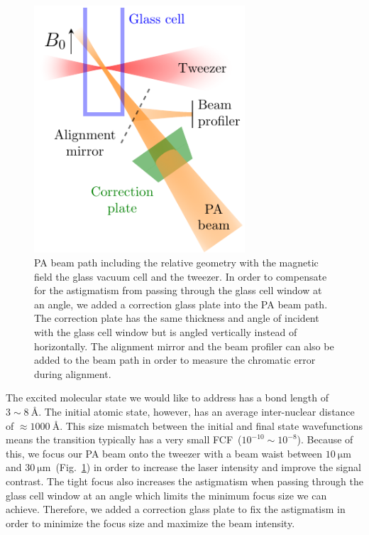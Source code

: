 \begin{figure}
  \centering
  \includegraphics[width=0.7\textwidth]{figures/pa_beampath.pdf}
  \caption[PA beam path]{
    PA beam path including the relative geometry with the magnetic field
    the glass vacuum cell and the tweezer.
    In order to compensate for the astigmatism from passing through the glass cell window
    at an angle, we added a correction glass plate into the PA beam path.
    The correction plate has the same thickness and angle of incident with the glass cell window
    but is angled vertically instead of horizontally.
    The alignment mirror and the beam profiler can also be added to the beam path
    in order to measure the chromatic error during alignment.
    \label{fig:pa:beampath}}
\end{figure}

The excited molecular state we would like to address has a bond length of $3\sim8~\text{\AA}$.
The initial atomic state, however, has an average inter-nuclear distance of
$\approx\!1000~\text{\AA}$.
This size mismatch between the initial and final state wavefunctions
means the transition typically has a very small FCF~($10^{-10}\sim10^{-8}$).
Because of this, we focus our PA beam onto the tweezer with a beam waist between
$10~\mathrm{\mu m}$ and $30~\mathrm{\mu m}$~(Fig.~\ref{fig:pa:beampath}) in order to
increase the laser intensity and improve the signal contrast.
The tight focus also increases the astigmatism when passing through
the glass cell window at an angle which limits the minimum focus size we can achieve.
Therefore, we added a correction glass plate to fix the astigmatism
in order to minimize the focus size and maximize the beam intensity.

